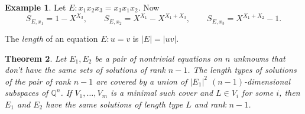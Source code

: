 \documentclass[submission]{eptcs}
\newtheorem{theorem}{Theorem}[section]
\theoremstyle{definition}
\newtheorem{example}[theorem]{Example}
\newcommand{\Q}{\mathbb Q}
\newcommand{\sx}[2]{ S_{#1,#2} }
\begin{document}
\begin{example}
Let $E: x_1 x_2 x_3 = x_3 x_1 x_2$. Now
\begin{equation*}
    \sx{E}{x_1} = 1 - X^{X_3}, \qquad
    \sx{E}{x_2} = X^{X_1} - X^{X_1 + X_3}, \qquad
    \sx{E}{x_3} = X^{X_1 + X_2} - 1.
\end{equation*}
\end{example}

The \emph{length} of an equation $E: u = v$ is $|E| = |uv|$.


\begin{theorem} \label{thm:cover}
Let $E_1, E_2$ be a pair of nontrivial equations on $n$ unknowns
that don't have the same sets of solutions of rank $n-1$. The length
types of solutions of the pair of rank $n-1$ are covered by a union
of $|E_1|^2$ $(n-1)$-dimensional subspaces of $\Q^n$. If $V_1,
\dots, V_m$ is a minimal such cover and $L \in V_i$ for some $i$,
then $E_1$ and $E_2$ have the same solutions of length type $L$ and
rank $n-1$.
\end{theorem}
\end{document}

